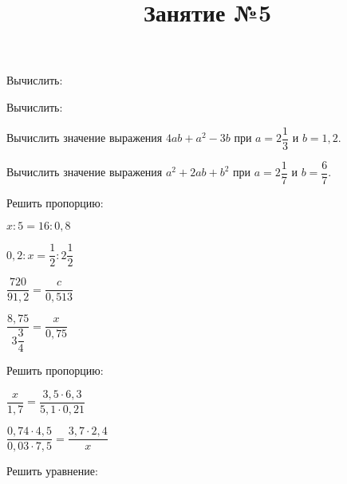 \begin{listofex}
	\item Вычислить:
	\begin{enumcols}[itemcolumns=3]
		\item {}
		\item {}
		\item {}
	\end{enumcols}
\end{listofex}
\newpage
\title{Занятие №5}
\begin{listofex}
	\item Вычислить:
	\begin{enumcols}[itemcolumns=1]
		\item {}
	\end{enumcols}
	\begin{enumcols}[itemcolumns=2, start=2]
		\item {}
		\item {}
	\end{enumcols}
	\item Вычислить значение выражения \( 4ab+a^2-3b \) при \( a=2\dfrac{1}{3} \) и \( b=1,2 \).
	\item Вычислить значение выражения \( a^2+2ab+b^2 \) при \( a=2\dfrac{1}{7} \) и \( b=\dfrac{6}{7} \).
	\item Решить пропорцию:
	\begin{enumcols}[itemcolumns=3]
		\item \( x:5=16:0,8 \)
		\item \( 0,2:x=\dfrac{1}{2}:2\dfrac{1}{2} \)
		\item \( \dfrac{720}{91,2}=\dfrac{c}{0,513} \)
		\item \( \dfrac{8,75}{3\dfrac{3}{4}}=\dfrac{x}{0,75} \)
	\end{enumcols}
	\item Решить пропорцию:
	\begin{enumcols}[itemcolumns=2]
		\item \( \dfrac{x}{1,7}=\dfrac{3,5\cdot6,3}{5,1\cdot0,21} \)
		\item \( \dfrac{0,74\cdot4,5}{0,03\cdot7,5}=\dfrac{3,7\cdot2,4}{x} \)
	\end{enumcols}
	\item Решить уравнение:
	\begin{enumcols}[itemcolumns=3]
		\item {}
		\item {}
		\item {}
	\end{enumcols}
\end{listofex}
